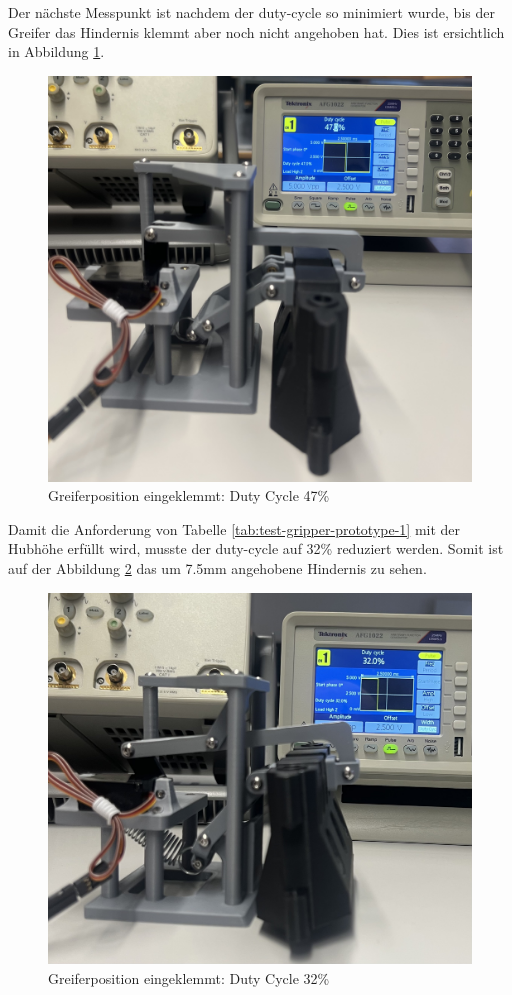\newpage

Der nächste Messpunkt ist nachdem der \gls{duty-cycle} so minimiert wurde, bis der Greifer das Hindernis klemmt aber noch nicht angehoben hat. Dies ist ersichtlich in Abbildung \ref{fig: Greiferposition eingeklemmt: Duty Cycle 47}.

\begin{figure}[H]
    \centering
    \includegraphics[width=0.8\linewidth]{img/ServoGreiferKlemmt.jpeg}
    \caption{Greiferposition eingeklemmt: Duty Cycle 47\%}
    \label{fig: Greiferposition eingeklemmt: Duty Cycle 47}
\end{figure}

\newpage

Damit die Anforderung von Tabelle \ref{tab:test-gripper-prototype-1} mit der Hubhöhe erfüllt wird, musste der \gls{duty-cycle} auf 32\% reduziert werden. Somit ist auf der Abbildung \ref{fig: Greiferposition angehoben: Duty Cycle 32} das um 7.5mm angehobene Hindernis zu sehen.

\begin{figure}[H]
    \centering
    \includegraphics[width=0.8\linewidth]{img/ServoHindernisAngehoben.jpeg}
    \caption{Greiferposition eingeklemmt: Duty Cycle 32\%}
    \label{fig: Greiferposition angehoben: Duty Cycle 32}
\end{figure}